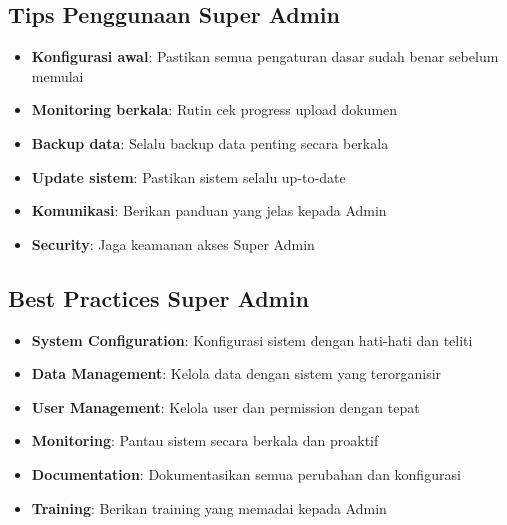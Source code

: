 \documentclass[12pt,a4paper]{article}
\begin{document}
\subsection{Tips Penggunaan Super Admin}
\begin{itemize}
\item \textbf{Konfigurasi awal}: Pastikan semua pengaturan dasar sudah benar sebelum memulai
\item \textbf{Monitoring berkala}: Rutin cek progress upload dokumen
\item \textbf{Backup data}: Selalu backup data penting secara berkala
\item \textbf{Update sistem}: Pastikan sistem selalu up-to-date
\item \textbf{Komunikasi}: Berikan panduan yang jelas kepada Admin
\item \textbf{Security}: Jaga keamanan akses Super Admin
\end{itemize}

\subsection{Best Practices Super Admin}
\begin{itemize}
\item \textbf{System Configuration}: Konfigurasi sistem dengan hati-hati dan teliti
\item \textbf{Data Management}: Kelola data dengan sistem yang terorganisir
\item \textbf{User Management}: Kelola user dan permission dengan tepat
\item \textbf{Monitoring}: Pantau sistem secara berkala dan proaktif
\item \textbf{Documentation}: Dokumentasikan semua perubahan dan konfigurasi
\item \textbf{Training}: Berikan training yang memadai kepada Admin
\end{itemize}

\appendix
\end{document}
